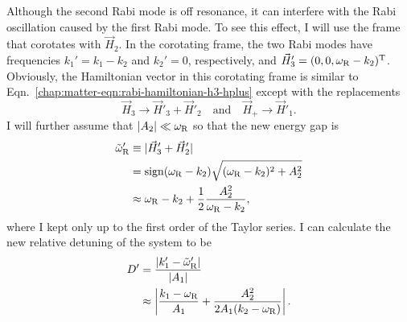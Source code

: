 Although the second Rabi mode is off resonance, it can interfere with the Rabi oscillation caused by the first Rabi mode.
To see this effect, I will use the frame that corotates with $\vec H_2$. In the corotating frame, the two Rabi modes have frequencies $k_1'=k_1-k_2$ and $k_2'=0$, respectively, and $\vec H'_3 = ( 0,0, \omega_{\mathrm R}- k_2 )^{\mathrm{T}}$. Obviously, the Hamiltonian vector in this corotating frame is similar to Eqn.~\ref{chap:matter-eqn:rabi-hamiltonian-h3-hplus} except with the replacements
\begin{equation}
    \vec H_3 \to \vec H'_3 + \vec H'_2  \quad \text{and} \quad \vec H_+ \to \vec H'_1.
\end{equation}
I will further assume that $\lvert A_2\rvert \ll \omega_\mathrm R$ so that the new energy gap is
\begin{align}
    \tilde\omega_{\mathrm{R}}' &\equiv \lvert \vec H'_3 + \vec H'_2 \rvert \nonumber\\
    &= \sign (\omega_{\RR}- k_2 ) \sqrt{ (\omega_{\RR}- k_2 )^2 + A_2^2 } \nonumber\\
    &\approx \omega_{\mathrm R} - k_2 + \frac{1}{2}\frac{A_2^2}{\omega_{\mathrm R} - k_2},
    \label{eq-new-energy-gap-due-to-second-mode-approximation}
\end{align}
where I kept only up to the first order of the Taylor series. I can calculate the new relative detuning of the system to be
\begin{align}
    \RD' &= \frac{\lvert k_1' - \tilde \omega_{\mathrm R}' \rvert}{\lvert A_1 \rvert}\nonumber\\
    &\approx \left \lvert \frac{ k_1-\omega_{\mathrm R}}{ A_1} + \frac{ A_2^2 }{2  A_1 ( k_2 - \omega_{\mathrm R})} \right  \rvert.
    \label{app:chap:matter-eq:relative-detuning-changed}
\end{align}
